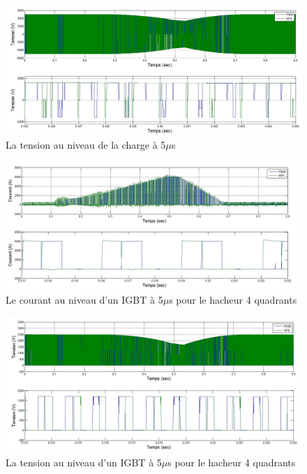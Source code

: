 \documentclass[11pt,letterpaper,final]{report}
\begin{document}
\begin{figure}[htb]
\centering
\includegraphics[scale=0.5]{Fig/DCP_AFE/5u/ten_ch.jpg}
\caption{La tension au niveau de la charge à 5$\mu$s}
\label{AF_DC_CHV5}
\end{figure}

\begin{figure}[htb]
\centering
\includegraphics[scale=0.5]{Fig/DCP_AFE/5u/hash_cou_IGBT.jpg}
\caption{Le courant au niveau d'un IGBT à 5$\mu$s pour le hacheur 4 quadrants}
\label{AF_DC_HAA5}
\end{figure}

\begin{figure}[htb]
\centering
\includegraphics[scale=0.5]{Fig/DCP_AFE/5u/hash_ten_IGBT.jpg}
\caption{La tension au niveau d'un IGBT à 5$\mu$s pour le hacheur 4 quadrants}
\label{AF_DC_HAV5}
\end{figure}
\end{document}
